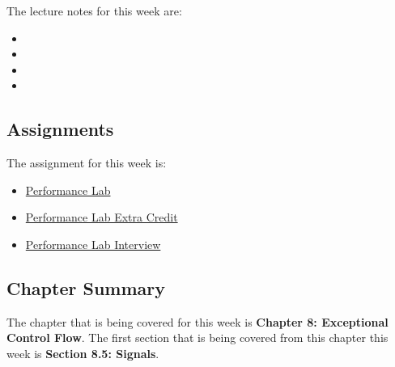 \noindent The lecture notes for this week are:

\begin{itemize}
    \item {}
    \item {}
    \item {}
    \item {}
\end{itemize}

\subsection{Assignments}

The assignment for this week is:

\begin{itemize}
    \item \href{https://github.com/cu-cspb-2400-fall-2023/lab4-perflab-QuantumCompiler}{Performance Lab} 
    \item \href{https://github.com/cu-cspb-2400-fall-2023/lab4-perflab-QuantumCompiler}{Performance Lab Extra Credit} 
    \item \href{https://applied.cs.colorado.edu/mod/scheduler/view.php?id=53286}{Performance Lab Interview} 
\end{itemize}

\subsection{Chapter Summary}

The chapter that is being covered for this week is \textbf{Chapter 8: Exceptional Control Flow}. The first section that is being covered from this chapter this week is \textbf{Section 8.5: Signals}.

